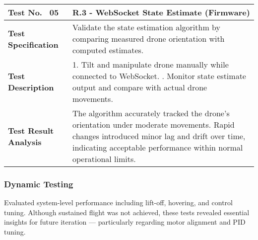 \begin{table}[H]
\centering
\renewcommand{\arraystretch}{1.2}
\begin{tabular}{|p{3.5cm}|p{12cm}|}
\hline
\textbf{Test No. \, 05} & \textbf{R.3 - WebSocket State Estimate} (Firmware) \\ \hline

\textbf{Test Specification} & 
Validate the state estimation algorithm by comparing measured drone orientation with computed estimates. \\ \hline

\textbf{Test Description} & 
1. Tilt and manipulate drone manually while connected to WebSocket. \newline
2. Monitor state estimate output and compare with actual drone movements. \\ \hline

\textbf{Test Result Analysis} & 
The algorithm accurately tracked the drone's orientation under moderate movements. Rapid changes introduced minor lag and drift over time, indicating acceptable performance within normal operational limits. \\ \hline
\end{tabular}
\end{table}

\subsubsection{Dynamic Testing} \leavevmode

Evaluated system-level performance including lift-off, hovering, and control tuning. Although sustained flight was not achieved, these tests revealed essential insights for future iteration — particularly regarding motor alignment and PID tuning. 

